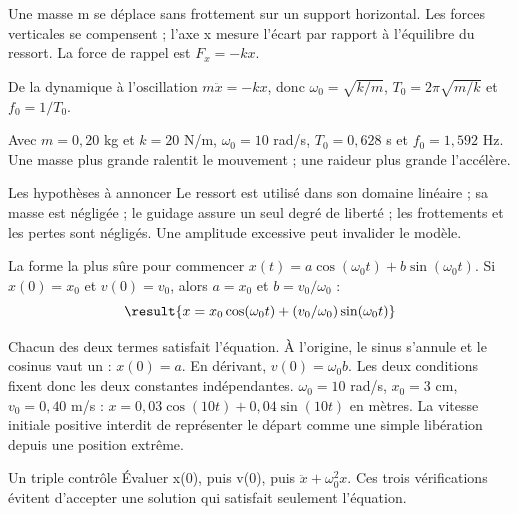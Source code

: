 Une masse m se déplace sans frottement sur un support horizontal. Les forces verticales se compensent ; l’axe x mesure l’écart par rapport à l’équilibre du ressort. La force de rappel est $F_x=-kx$.
\begin{loi}{De la dynamique à l’oscillation}
$m\ddot x=-kx$, donc $\omega_0=\sqrt{k/m}$, $T_0=2\pi\sqrt{m/k}$ et $f_0=1/T_0$.
\end{loi}
Avec $m=0{,}20$ kg et $k=20$ N/m, $\omega_0=10$ rad/s, $T_0=0{,}628$ s et $f_0=1{,}592$ Hz. Une masse plus grande ralentit le mouvement ; une raideur plus grande l’accélère.
\begin{methode}{Les hypothèses à annoncer}
Le ressort est utilisé dans son domaine linéaire ; sa masse est négligée ; le guidage assure un seul degré de liberté ; les frottements et les pertes sont négligés. Une amplitude excessive peut invalider le modèle.
\end{methode}


\begin{loi}{La forme la plus sûre pour commencer}
$x(t)=a\cos(\omega_0t)+b\sin(\omega_0t)$. Si $x(0)=x_0$ et $v(0)=v_0$, alors $a=x_0$ et $b=v_0/\omega_0$ : \[\result{x=x_0\cos(\omega_0t)+(v_0/\omega_0)\sin(\omega_0t)}\]
\end{loi}
Chacun des deux termes satisfait l’équation. À l’origine, le sinus s’annule et le cosinus vaut un : $x(0)=a$. En dérivant, $v(0)=\omega_0b$. Les deux conditions fixent donc les deux constantes indépendantes.
$\omega_0=10$ rad/s, $x_0=3$ cm, $v_0=0{,}40$ m/s : $x=0{,}03\cos(10t)+0{,}04\sin(10t)$ en mètres. La vitesse initiale positive interdit de représenter le départ comme une simple libération depuis une position extrême.
\begin{methode}{Un triple contrôle}
Évaluer x(0), puis v(0), puis $\ddot x+\omega_0^2x$. Ces trois vérifications évitent d’accepter une solution qui satisfait seulement l’équation.
\end{methode}


